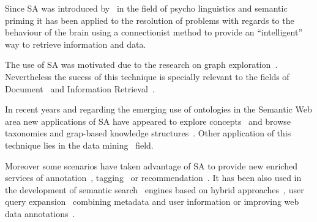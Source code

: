 Since SA was introduced by~\cite{Collins_Loftus_1975} in the field of 
psycho linguistics and semantic priming it has been applied to the resolution
of problems with regards to the behaviour of the brain using a connectionist method
to provide an ``intelligent'' way to retrieve information and data. 

The use of SA was motivated due to the research on graph exploration~\cite{Scott1981,AndersonTheory,Cohen1987}. Nevertheless
the sucess of this technique is specially relevant to the fields of Document~\cite{Cui03,turtle91inference,Schumacher+2008search} 
and Information Retrieval~\cite{SpreadingActivationIR,Helmut2004,Agosti1993,Grinberg:2011:ASA:1940632.1940674,Scott1981}.

In recent years and regarding the emerging use of ontologies in the Semantic Web area new applications of SA have
appeared to explore concepts~\cite{Qiu93} and browse taxonomies and grap-based knowledge 
structures~\cite{Chen95,DBLP:journals/cogsr/KatiforiVD10,DBLP:journals/ijsc/DixKLVS10,liu_et_al_2005}. Other
application of this technique lies in the data mining~\cite{paper:troussov:2008} field.

Moreover some scenarios have taken advantage of SA to provide new enriched services
of annotation~\cite{GelgiVD05,Chen:2007:PSA:1780653.1780702}, tagging~\cite{labraTagging2007,LabraWesoNet} or
recommendation~\cite{citeulike:3779904,gouws-vanrooyen-engelbrecht:2010:CCSR}. It has been also used in the development of 
semantic search~\cite{conf-sofsem-Suchal08,Wolverton94retrievingsemantically} engines
based on hybrid approaches~\cite{bopaEstonia,RochaSA04}, user query expansion~\cite{767402}
combining metadata and user information or improving web data annotations~\cite{GelgiVD05}.
% 

